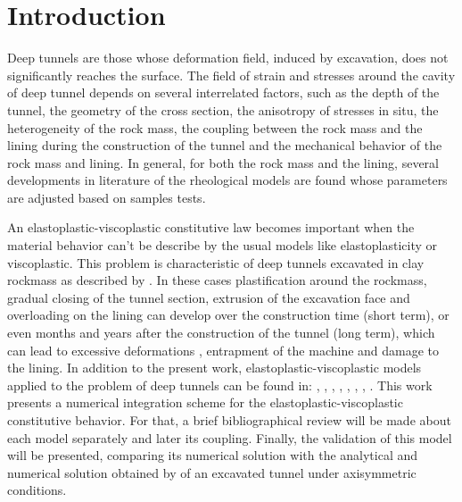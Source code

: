 \documentclass[Journal,letterpaper]{ascelike-new}
\begin{document}
\section{Introduction}
Deep tunnels are those whose deformation field, induced by excavation, does not significantly reaches the surface. The field of strain and stresses around the cavity of deep tunnel depends on several interrelated factors, such as the depth of the tunnel, the geometry of the cross section, the anisotropy of stresses in situ, the heterogeneity of the rock mass, the coupling between the rock mass and the lining during the construction of the tunnel and the mechanical behavior of the rock mass and lining. In general, for both the rock mass and the lining, several developments in literature of the rheological models are found whose parameters are adjusted based on samples tests.

An elastoplastic-viscoplastic constitutive law becomes important when the material behavior can’t be describe by the usual models like elastoplasticity or viscoplastic. This problem is characteristic of deep tunnels excavated in clay rockmass as described by . In these cases plastification around the rockmass, gradual closing of the tunnel section, extrusion of the excavation face and overloading on the lining can develop over the construction time (short term), or even months and years after the construction of the tunnel (long term), which can lead to excessive deformations \cite{barla2008}, entrapment of the machine \cite{ramoni2010} and damage to the lining.
In addition to the present work, elastoplastic-viscoplastic models applied to the problem of deep tunnels can be found in: , , , , , , , .
This work presents a numerical integration scheme for the elastoplastic-viscoplastic constitutive behavior.
For that, a brief bibliographical review will be made about each model separately and later its coupling.
Finally, the validation of this model will be presented, comparing its numerical solution with the analytical and numerical solution obtained by  of an excavated tunnel under axisymmetric conditions.
\end{document}
